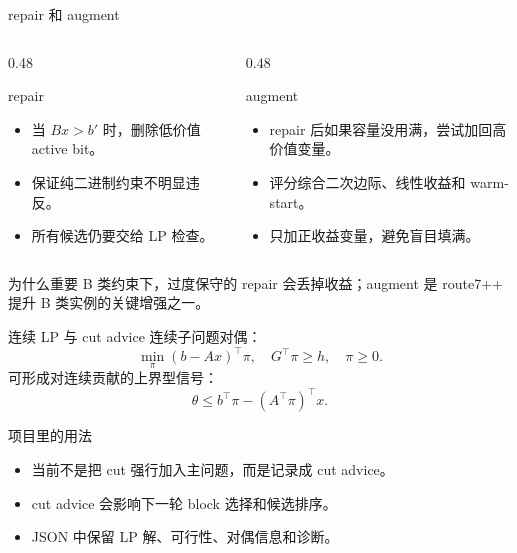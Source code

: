 \documentclass[aspectratio=169]{beamer}
\begin{document}
\begin{frame}{repair 和 augment}
\small
\begin{columns}[T,onlytextwidth]
\begin{column}{0.48\textwidth}
\begin{block}{repair}
\begin{itemize}
  \item 当 $Bx>b'$ 时，删除低价值 active bit。
  \item 保证纯二进制约束不明显违反。
  \item 所有候选仍要交给 LP 检查。
\end{itemize}
\end{block}
\end{column}
\begin{column}{0.48\textwidth}
\begin{block}{augment}
\begin{itemize}
  \item repair 后如果容量没用满，尝试加回高价值变量。
  \item 评分综合二次边际、线性收益和 warm-start。
  \item 只加正收益变量，避免盲目填满。
\end{itemize}
\end{block}
\end{column}
\end{columns}
\vspace{2mm}
\begin{alertblock}{为什么重要}
B 类约束下，过度保守的 repair 会丢掉收益；augment 是 route7++ 提升 B 类实例的关键增强之一。
\end{alertblock}
\end{frame}

\begin{frame}{连续 LP 与 cut advice}
\small
连续子问题对偶：
\[
\min_\pi (b-Ax)^\top \pi,\quad G^\top\pi\ge h,\quad \pi\ge 0.
\]
可形成对连续贡献的上界型信号：
\[
\theta \le b^\top\pi-(A^\top\pi)^\top x.
\]
\begin{block}{项目里的用法}
\begin{itemize}
  \item 当前不是把 cut 强行加入主问题，而是记录成 cut advice。
  \item cut advice 会影响下一轮 block 选择和候选排序。
  \item JSON 中保留 LP 解、可行性、对偶信息和诊断。
\end{itemize}
\end{block}
\end{frame}
\end{document}
